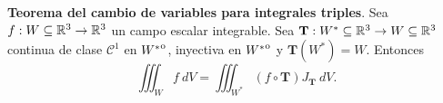 \begin{theorem}
    \textbf{Teorema del cambio de variables para integrales triples}. Sea $f:W\subseteq\mathbb{R}^3\to\mathbb{R}^3$ un campo escalar integrable. Sea $\mathbf{T}:W^*\subseteq\mathbb{R}^3\to W\subseteq\mathbb{R}^3$ continua de clase $\mathcal{C}^1$ en ${\kern0ptW^*}^{\mathrm{o}}$, inyectiva en ${\kern0ptW^*}^{\mathrm{o}}$ y $\mathbf{T}(W^*)=W$. Entonces
    \[
        \iiint_W f\:dV=\iiint_{W^*}(f\circ\mathbf{T})J_\mathbf{T}\:dV.
    \]
\end{theorem}
